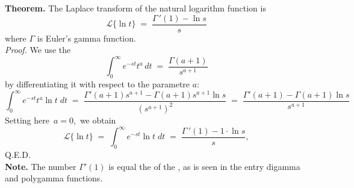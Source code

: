 \documentclass[12pt]{article}
\theoremstyle{definition}
\begin{document}
\textbf{Theorem.}\; The Laplace transform of the natural logarithm function is
$$\mathcal{L}\{\ln{t}\} \;=\; \frac{\Gamma\,'(1)-\ln{s}}{s}$$
where $\Gamma$ is Euler's gamma function.\\

{\em Proof.}\; We use the 
$$\int_0^\infty e^{-st}t^a\,dt \;=\; \frac{\Gamma(a\!+\!1)}{s^{a+1}}$$
by differentiating it with respect to the parametre $a$:
$$\int_0^\infty e^{-st}t^a\ln{t}\;dt \;=\; \frac{\Gamma'(a\!+\!1)s^{a+1}-\Gamma(a\!+\!1)s^{a+1}\ln{s}}{(s^{a+1})^2}
\;=\; \frac{\Gamma'(a\!+\!1)-\Gamma(a\!+\!1)\ln{s}}{s^{a+1}}$$
Setting here\, $a = 0$,\, we obtain
$$\mathcal{L}\{\ln{t}\} \;=\; \int_0^\infty e^{-st}\ln{t}\;dt \;=\; \frac{\Gamma\,'(1)-1\cdot\ln{s}}{s},$$
Q.E.D.\\

\textbf{Note.}\; The number $\Gamma'(1)$ is equal the  of the , as is seen in the entry digamma and polygamma functions.



\end{document}
